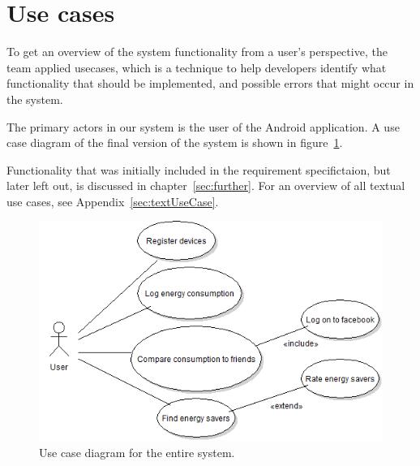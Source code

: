 \section{Use cases}
To get an overview of the system functionality from a user's perspective, the team applied \glspl{usecase}, which is a technique to help developers identify what functionality that should be implemented, and possible errors that might occur in the system.

The primary actors in our system is the user of the Android application. A use case diagram of the final version of the system is shown in figure~\ref{fig:usecase}.

Functionality that was initially included in the requirement specifictaion, but later left out, is discussed in chapter~\ref{sec:further}. 
For an overview of all textual use cases, see Appendix~\ref{sec:textUseCase}.\\

\begin{figure}[H]
\includegraphics[width=\textwidth]{ch/specification/fig/currentUsecase.png}
\caption{Use case diagram for the entire system.}
\label{fig:usecase}
\end{figure}
